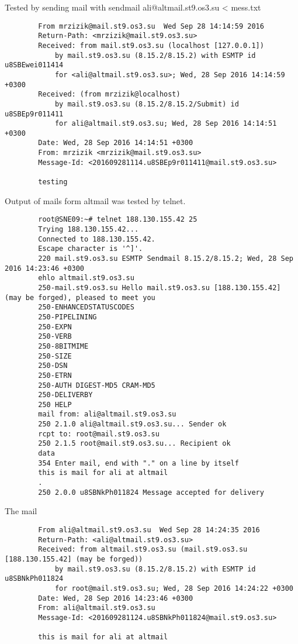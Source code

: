 \documentclass[10pt]{article}
\begin{document}
  Tested by sending mail with sendmail ali@altmail.st9.os3.su < mess.txt 
  \begin{verbatim}
        From mrzizik@mail.st9.os3.su  Wed Sep 28 14:14:59 2016
        Return-Path: <mrzizik@mail.st9.os3.su>
        Received: from mail.st9.os3.su (localhost [127.0.0.1])
            by mail.st9.os3.su (8.15.2/8.15.2) with ESMTP id u8SBEwei011414
            for <ali@altmail.st9.os3.su>; Wed, 28 Sep 2016 14:14:59 +0300
        Received: (from mrzizik@localhost)
            by mail.st9.os3.su (8.15.2/8.15.2/Submit) id u8SBEp9r011411
            for ali@altmail.st9.os3.su; Wed, 28 Sep 2016 14:14:51 +0300
        Date: Wed, 28 Sep 2016 14:14:51 +0300
        From: mrzizik <mrzizik@mail.st9.os3.su>
        Message-Id: <201609281114.u8SBEp9r011411@mail.st9.os3.su>

        testing
  \end{verbatim}
  Output of mails form altmail was tested by telnet.
  \begin{verbatim}
        root@SNE09:~# telnet 188.130.155.42 25
        Trying 188.130.155.42...
        Connected to 188.130.155.42.
        Escape character is '^]'.
        220 mail.st9.os3.su ESMTP Sendmail 8.15.2/8.15.2; Wed, 28 Sep 2016 14:23:46 +0300
        ehlo altmail.st9.os3.su
        250-mail.st9.os3.su Hello mail.st9.os3.su [188.130.155.42] (may be forged), pleased to meet you
        250-ENHANCEDSTATUSCODES
        250-PIPELINING
        250-EXPN
        250-VERB
        250-8BITMIME
        250-SIZE
        250-DSN
        250-ETRN
        250-AUTH DIGEST-MD5 CRAM-MD5
        250-DELIVERBY
        250 HELP
        mail from: ali@altmail.st9.os3.su
        250 2.1.0 ali@altmail.st9.os3.su... Sender ok
        rcpt to: root@mail.st9.os3.su
        250 2.1.5 root@mail.st9.os3.su... Recipient ok
        data
        354 Enter mail, end with "." on a line by itself
        this is mail for ali at altmail
        .
        250 2.0.0 u8SBNkPh011824 Message accepted for delivery
    \end{verbatim}
    The mail
    \begin{verbatim}
        From ali@altmail.st9.os3.su  Wed Sep 28 14:24:35 2016
        Return-Path: <ali@altmail.st9.os3.su>
        Received: from altmail.st9.os3.su (mail.st9.os3.su [188.130.155.42] (may be forged))
            by mail.st9.os3.su (8.15.2/8.15.2) with ESMTP id u8SBNkPh011824
            for root@mail.st9.os3.su; Wed, 28 Sep 2016 14:24:22 +0300
        Date: Wed, 28 Sep 2016 14:23:46 +0300
        From: ali@altmail.st9.os3.su
        Message-Id: <201609281124.u8SBNkPh011824@mail.st9.os3.su>

        this is mail for ali at altmail
    \end{verbatim}
\end{document}

